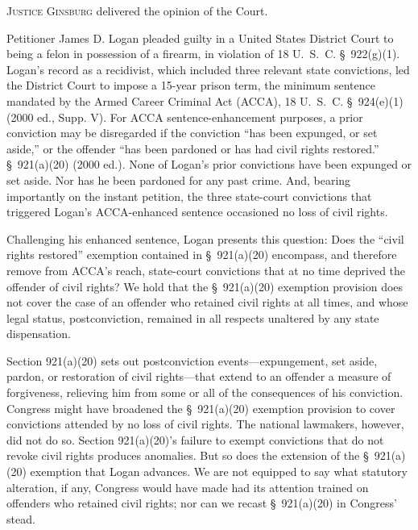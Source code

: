 
\setcounter{page}{26}

  \textsc{Justice Ginsburg} delivered the opinion of the Court.

  Petitioner James D. Logan pleaded guilty in a United States District Court to being a felon in possession of a firearm, in violation of 18 U.~S.~C. \S~922(g)(1). Logan's record as a recidivist, which included three relevant state convictions, led the District Court to impose a 15-year prison term, the minimum sentence mandated by the Armed Career Criminal Act (ACCA), 18 U.~S.~C. \S~924(e)(1) (2000 ed., Supp. V). For ACCA sentence-enhancement purposes, a prior conviction may be disregarded if the conviction ``has been expunged, or set aside,'' or the offender ``has been pardoned or has had civil rights restored.'' \S~921(a)(20) (2000 ed.). None of Logan's prior convictions have been expunged or set aside. Nor has he been pardoned for any past crime. And, bearing importantly on the instant petition, the three state-court convictions that triggered Logan's ACCA-enhanced sentence occasioned no loss of civil rights.

  Challenging his enhanced sentence, Logan presents this question: Does the ``civil rights restored'' exemption contained in \S~921(a)(20) encompass, and therefore remove from ACCA's reach, state-court convictions that at no time deprived the offender of civil rights? We hold that the \S~921(a)(20) exemption provision does not cover the case of an offender who retained civil rights at all times, and whose legal status, postconviction, remained in all respects unaltered by any state dispensation.

  Section 921(a)(20) sets out postconviction events---expungement, set aside, pardon, or restoration of civil rights---that extend to an offender a measure of forgiveness, relieving him from some or all of the consequences of his conviction. Congress might have broadened the \S~921(a)(20) exemption provision to cover convictions attended by no loss of civil rights. The national lawmakers, however, did not do so. Section 921(a)(20)'s failure to exempt convictions that do not revoke civil rights produces anomalies. But so does the extension of the \S~921(a)(20) exemption that Logan advances. \newpage  We are not equipped to say what statutory alteration, if any, Congress would have made had its attention trained on offenders who retained civil rights; nor can we recast \S~921(a)(20) in Congress' stead.

